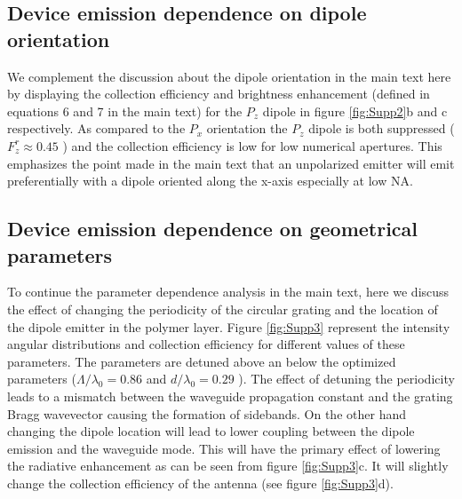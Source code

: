 \documentclass[main.tex]{subfile}
\begin{document}
\subsection*{Device emission dependence on dipole orientation}
We complement the discussion about the dipole orientation in the main text here by displaying the collection efficiency and brightness enhancement (defined in equations 6 and 7 in the main text) for the $P_z$ dipole in figure \ref{fig:Supp2}b and c respectively. 
As compared to the $P_x$ orientation the $P_z$ dipole is both suppressed ($F_z^r \approx 0.45 $ ) and the collection efficiency is low for low numerical apertures. 
This emphasizes the point made in the main text that an unpolarized emitter will emit preferentially with a dipole oriented along the x-axis especially at low NA. 
\subsection*{Device emission dependence on geometrical parameters}
To continue the parameter dependence analysis in the main text, here we discuss the effect of changing the periodicity of the circular grating and the location of the dipole emitter in the polymer layer.
Figure \ref{fig:Supp3} represent the intensity angular distributions and collection efficiency for different values of these parameters. 
The parameters are detuned above an below the optimized parameters ($\Lambda/\lambda_0 =0.86$ and $d/\lambda_0 = 0.29$ ). 
The effect of detuning the periodicity leads to a mismatch between the waveguide propagation constant and the grating Bragg wavevector causing  the formation of sidebands. 
On the other hand changing the dipole location will lead to lower coupling between the dipole emission and the waveguide mode. 
This will have the primary effect of lowering the radiative enhancement as can be seen from figure \ref{fig:Supp3}c.
It will slightly change the collection efficiency of the antenna (see figure \ref{fig:Supp3}d). 
  
\end{document}
